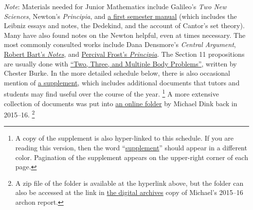 \documentclass[10pt]{article}
\begin{document}
{\small \emph{Note}: Materials needed for Junior Mathematics 
include Galileo's \emph{Two New Sciences}, Newton's \emph{Principia}, and
\href{https://drive.google.com/file/d/1kaRK0caoK1948YU4dCFFE52zWJb776ZJ/view?usp=sharing}%
{a first semester manual} (which includes the Leibniz essays and notes,
the Dedekind, and the account of Cantor's set theory).  
Many have also found notes on the Newton helpful, even at times necessary.  
The most commonly consulted works include Dana Densmore's \emph{Central Argument},
\href{https://drive.google.com/file/d/0BwccG5Ei3816aUtwck5GTUVRWkk/view?usp=sharing}{Robert
Bart's \emph{Notes}}, and
\href{https://drive.google.com/file/d/0BwccG5Ei3816cHlRaktYaTJRM0E/view?usp=sharing}%
{Percival Frost's \emph{Principia}}. 
The Section 11 propositions are usually done with
\href{https://drive.google.com/file/d/1c0gRZDPmndb5C2JiWYSOIiMQD-mNR2cD/view?usp=sharing}%
{``Two, Three, and Multiple Body Problems''}, written by Chester Burke.
In the more detailed schedule below, there is also occasional mention of
\href{https://drive.google.com/file/d/1PP99RsI_xEZ8rkgXSOlNBS2Wuk_CJkvN/view?usp=sharing}%
{a supplement}, which includes additional documents
that tutors and students may find useful over the course of the year.%
\footnote{A copy of the supplement is also hyper-linked to this schedule. 
If you are reading this version, then the word ``\hyperref[supple.1]{supplement}''
should appear in a different color. Pagination of the supplement appears on the upper-right
corner of each page.}
A more extensive collection of documents was put into
\href{https://drive.google.com/file/d/1iZOownvFcTZxxFA6KRutjVLpIjE74503/view?usp=sharing}%
{an online folder} by Michael Dink back in 2015--16.%
\footnote{A zip file of the folder is available at the hyperlink above,
but the folder can also be accessed at the link 
in \href{http://digitalarchives.sjc.edu/faculty}{the digital archives} copy
of Michael's 2015--16 archon report.}}


\end{document}
